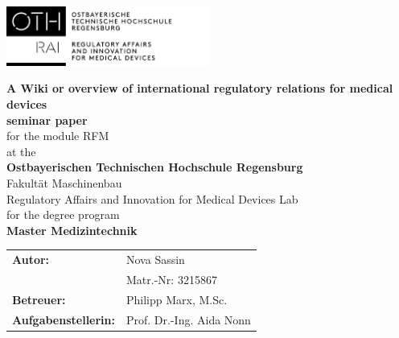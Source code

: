 \documentclass[11pt,a4paper,bibliography=totoc,listof=totoc,pointlessnumbers,open=any]{scrbook}
\begin{document}
\pagestyle{scrheadings}

\newpage
\thispagestyle{empty}
\begin{flushleft}
	\includegraphics[width=0.5\textwidth]{Titel/OTH_Logo_RAI.jpg}
\end{flushleft}

\begin{centering}
	\bigskip 
	\bigskip
	\bigskip
	\bigskip		
	\bigskip
	\huge\textrm{\textbf{A Wiki or overview of international regulatory relations for medical devices }}\\
	\bigskip
	\bigskip
	\bigskip 
	\bigskip 
	\bigskip
		\bigskip
		\bigskip 
		\bigskip
		\bigskip
	\LARGE\textrm{\textbf{seminar paper}}\\
	\bigskip
	\small\textrm{for the module RFM}\\
	\smallskip
	\small\textrm{at the}\\
	\smallskip
	\large\textrm{\textbf{Ostbayerischen Technischen Hochschule Regensburg}}\\
	\smallskip
	\small\textrm{Fakultät Maschinenbau}\\
	\smallskip
	\small\textrm{Regulatory Affairs and Innovation for Medical Devices Lab}\\
	\smallskip
	\small\textrm{for the degree program}\\
	\smallskip
	\large\textrm{\textbf{Master Medizintechnik}}
	\bigskip 
	\bigskip 
	\bigskip
	\bigskip
	\bigskip 
	\bigskip
	\bigskip 
	\bigskip
	\bigskip 
    \begin{table}[H]
    	\flushleft
    	\renewcommand{\arraystretch}{1.2}
    	\begin{tabular}{ll}
    	\textbf{Autor:} & \textrm{Nova Sassin} \\ 
    	 & \textrm{Matr.-Nr: } 3215867 \\
    	\textbf{Betreuer:} & \textrm{Philipp Marx, M.Sc.} \\ 
    	\textbf{Aufgabenstellerin:} & \textrm{Prof. Dr.-Ing. Aida Nonn}
    	\end{tabular}
    \end{table}
\end{centering}

\newpage
\tableofcontents 
\end{document}
